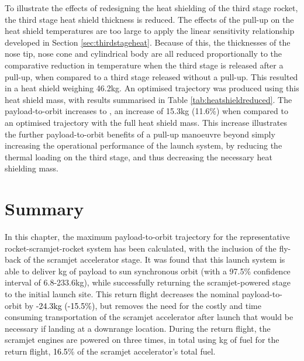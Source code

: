To illustrate the effects of redesigning the heat shielding of the third stage rocket, the third stage heat shield thickness is reduced. The effects of the pull-up on the heat shield temperatures are too large to apply the linear sensitivity relationship developed in Section \ref{sec:thirdstageheat}. Because of this, the thicknesses of the nose tip, nose cone and cylindrical body are all reduced proportionally to the comparative reduction in temperature when the third stage is released after a pull-up, when compared to a third stage released without a pull-up. This resulted in a heat shield weighing 46.2kg. An optimised trajectory was produced using this heat shield mass, with results summarised in Table \ref{tab:heatshieldreduced}. The payload-to-orbit increases to \PayloadToOrbitTPSreduced, an increase of 15.3kg (11.6\%) when compared to an optimised trajectory with the full heat shield mass. This increase illustrates the further payload-to-orbit benefits of a pull-up manoeuvre beyond simply increasing the operational performance of the launch system, by reducing the thermal loading on the third stage, and thus decreasing the necessary heat shielding mass. 

%
%
%
%
%
%
%
%
%
%
%
%
%
%
%
%
%


\section{Summary}


In this chapter, the maximum payload-to-orbit trajectory for the representative rocket-scramjet-rocket system has been calculated, with the inclusion of the fly-back of the scramjet accelerator stage. It was found that this launch system is able to deliver \PayloadToOrbitStandard kg of payload to sun synchronous orbit (with a 97.5\% confidence interval of 6.8-233.6kg), while successfully returning the scramjet-powered stage to the initial launch site. 
This return flight decreases the nominal payload-to-orbit by \textcolor{black}{-24.3kg (-15.5\%)}, but removes the need for the costly and time consuming transportation of the scramjet accelerator after launch that would be necessary if landing at a downrange location.
During the return flight, the scramjet engines are powered on three times, in total using \returnFuelStandard kg of fuel for the return flight, \textcolor{black}{16.5}\% of the scramjet accelerator's total fuel.

